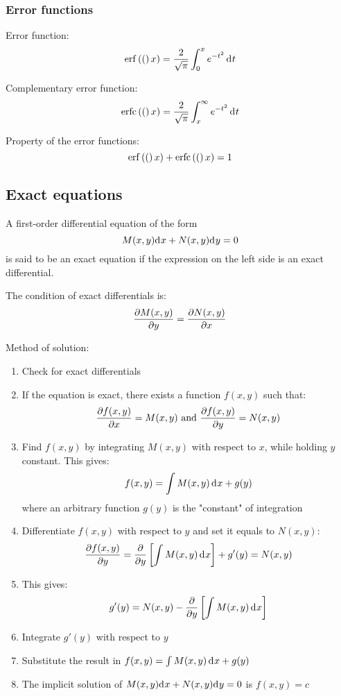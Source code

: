 \documentclass[10pt, twocolumn]{article}
\theoremstyle{definition}
\begin{document}
\subsubsection*{Error functions}
Error function:
\[
  \mathrm{erf} \left( ( \right)x) = \frac{2}{\sqrt{\pi}}\int_0 ^x {e^{-t^2 } \,\mathrm{d}^{} t}
\]

Complementary error function:
\[
  \mathrm{erfc} \left( ( \right)x) = \frac{2}{\sqrt{\pi}}\int_x ^{\infty}{e^{-t^2 } \,\mathrm{d}^{} t}
\]

Property of the error functions:
\[
  \mathrm{erf} \left( ( \right)x) + \mathrm{erfc} \left( ( \right)x) = 1
\]


\subsection{Exact equations}
A first-order differential equation of the form
\[
  M(x,y)\mathrm{d}^{} x + N(x,y)\mathrm{d}^{} y = 0
\]
is said to be an exact equation if the expression on the left side is an exact differential.

The condition of exact differentials is:
\[
  \frac{\partial M(x, y)}{\partial y} = \frac{\partial N(x, y)}{\partial x}
\]

Method of solution:
\begin{enumerate}
  \item Check for exact differentials
  \item If the equation is exact, there exists a function \(f(x,y)\) such that:
        \[
          \frac{\partial f(x, y)}{\partial x} = M(x,y) \text{ and } \frac{\partial f(x, y)}{\partial y} = N(x,y)
        \]
  \item Find \(f(x,y)\) by integrating \(M(x,y)\) with respect to \(x\), while holding \(y\) constant.
        This gives:
        \[
          f(x,y) = \int{M(x,y)\,\mathrm{d}^{} x} + g(y)
        \]
        where an arbitrary function \(g(y)\) is the "constant" of integration
  \item Differentiate \(f(x,y)\) with respect to \(y\) and set it equals to \(N(x,y)\):
        \[
          \frac{\partial f(x, y)}{\partial y} = \frac{\partial }{\partial y}\left[ \int{M(x,y)\,\mathrm{d}^{} x} \right] + g'(y) = N(x,y)
        \]
  \item This gives:
        \[
          g'(y) = N(x,y) - \frac{\partial }{\partial y}\left[ \int{M(x,y)\,\mathrm{d}^{} x} \right]
        \]
  \item Integrate \(g'(y)\) with respect to \(y\)
  \item Substitute the result in \(f(x,y) = \int{M(x,y)\,\mathrm{d}^{} x} + g(y)\)
  \item The implicit solution of \(M(x,y)\mathrm{d}^{} x + N(x,y)\mathrm{d}^{} y = 0\) is \(f(x,y) = c\)
\end{enumerate}
\end{document}
